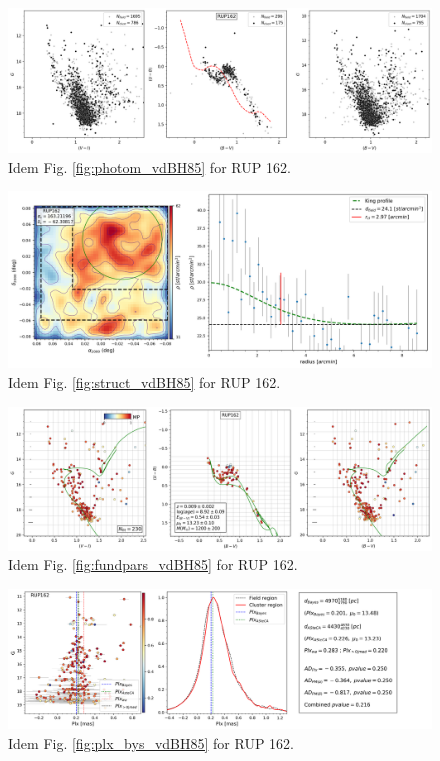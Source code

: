 \documentclass[draft]{aa}
\begin{document}
\begin{figure}[ht]
    \centering
    \includegraphics[width=\hsize]{../figs/obs_RUP162.png}
    \caption{Idem Fig. \ref{fig:photom_vdBH85} for RUP 162.}
    \label{fig47}
\end{figure}
\begin{figure}[ht]
    \centering
    \includegraphics[width=\hsize]{../figs/dmap_rup162.png}
    \caption{Idem Fig. \ref{fig:struct_vdBH85} for RUP 162.}
    \label{fig48}
\end{figure}
\begin{figure}[ht]
    \centering
    \includegraphics[width=\hsize]{../figs/cmds_rup162.png}
    \caption{Idem Fig. \ref{fig:fundpars_vdBH85} for RUP 162.}
    \label{fig49}
\end{figure}
\begin{figure}[ht]
    \centering
    \includegraphics[width=\hsize]{../figs/plx_RUP162.png}
    \caption{Idem Fig. \ref{fig:plx_bys_vdBH85} for RUP 162.}
    \label{fig50}
\end{figure}
\end{document}
